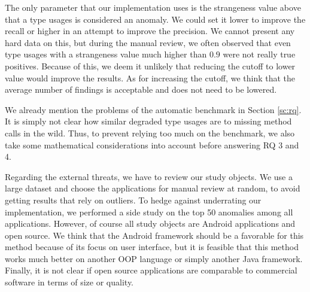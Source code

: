 The only parameter that our implementation uses is the strangeness value above that a type usages is considered an anomaly.
We could set it lower to improve the recall or higher in an attempt to improve the precision.
We cannot present any hard data on this, but during the manual review, we often observed that even type usages with a strangeness value much higher than $0.9$ were not really true positives.
Because of this, we deem it unlikely that reducing the cutoff to lower value would improve the results.
As for increasing the cutoff, we think that the average number of findings is acceptable and does not need to be lowered.

We already mention the problems of the automatic benchmark in Section \ref{sc:rq}.
It is simply not clear how similar degraded type usages are to missing method calls in the wild.
Thus, to prevent relying too much on the benchmark, we also take some mathematical considerations into account before answering RQ 3 and 4.

Regarding the external threats, we have to review our study objects.
We use a large dataset and choose the applications for manual review at random, to avoid getting results that rely on outliers.
To hedge against underrating our implementation, we performed a side study on the top 50 anomalies among all applications.
However, of course all study objects are Android applications and open source.
We think that the Android framework should be a favorable for this method because of its focus on user interface, but it is feasible that this method works much better on another OOP language or simply another Java framework.
Finally, it is not clear if open source applications are comparable to commercial software in terms of size or quality.


